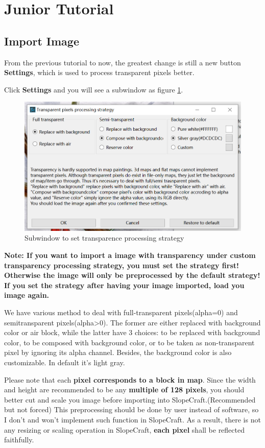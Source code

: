\documentclass{article}
\begin{document}
    \section{Junior Tutorial}
    \subsection{Import Image}
    From the previous tutorial to now, the greatest change is still a new button \textbf{Settings}, which is used to process transparent pixels better.
 
    Click \textbf{Settings} and you will see a subwindow as figure \ref*{SetTPS}.

    \begin{figure}[htbp]
        \centering
        \includegraphics[width=15cm]{Img1_TPS.png}
        \caption{Subwindow to set transparence processing strategy}
        \label{SetTPS}
    \end{figure}
    
    \textbf{Note: If you want to import a image with transparency under custom transparency processing strategy, you must set the strategy first! Otherwise the image will only be preprocessed by the default strategy! If you set the strategy after having your image imported, load you image again.}

    We have various method to deal with full-transparent pixels(alpha=0) and semitransparent pixels(alpha>0). The former are either replaced with background color or air block, while the latter have 3 choices: to be replaced with background color, to be composed with background color, or to be taken as non-transparent pixel by ignoring its alpha channel. Besides, the background color is also customizable. In default it's light gray.

    Please note that each \textbf{pixel corresponds to a block in map}. Since the width and height are recommended to be any \textbf{multiple of 128 pixels}, you should better cut and scale you image before importing into SlopeCraft.(Recommended but not forced) This preprocessing should be done by user instead of software, so I don't and won't implement such function in SlopeCraft. As a result, there is not any resizing or scaling operation in SlopeCraft, \textbf{each pixel} shall be reflected faithfully.
\end{document}
